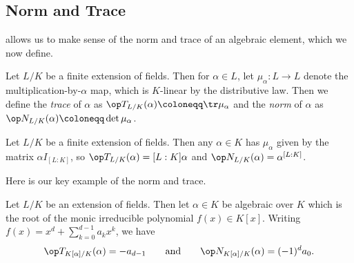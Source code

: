 \documentclass[../notes.tex]{subfiles}
\begin{document}
\subsection{Norm and Trace} \label{subsec:norm-tr}
 allows us to make sense of the norm and trace of an algebraic element, which we now define.
\begin{definition}
	Let $L/K$ be a finite extension of fields. Then for $\alpha\in L$, let $\mu_\alpha\colon L\to L$ denote the multiplication-by-$\alpha$ map, which is $K$-linear by the distributive law. Then we define the \textit{trace} of $\alpha$ as $\op T_{L/K}(\alpha)\coloneqq\tr\mu_\alpha$ and the \textit{norm} of $\alpha$ as $\op N_{L/K}(\alpha)\coloneqq\det\mu_\alpha$.
\end{definition}
\begin{example}
	Let $L/K$ be a finite extension of fields. Then any $\alpha\in K$ has $\mu_\alpha$ given by the matrix $\alpha I_{[L:K]}$, so $\op T_{L/K}(\alpha)=[L:K]\alpha$ and $\op N_{L/K}(\alpha)=\alpha^{[L:K]}$.
\end{example}
Here is our key example of the norm and trace.
\begin{proposition} \label{prop:norm-and-tr-by-min-poly}
	Let $L/K$ be an extension of fields. Then let $\alpha\in K$ be algebraic over $K$ which is the root of the monic irreducible polynomial $f(x)\in K[x]$. Writing $f(x)=x^d+\sum_{k=0}^{d-1}a_kx^k$, we have
	\[\op T_{K[\alpha]/K}(\alpha)=-a_{d-1}\qquad\text{and}\qquad\op N_{K[\alpha]/K}(\alpha)=(-1)^da_0.\]
\end{proposition}
\end{document}
